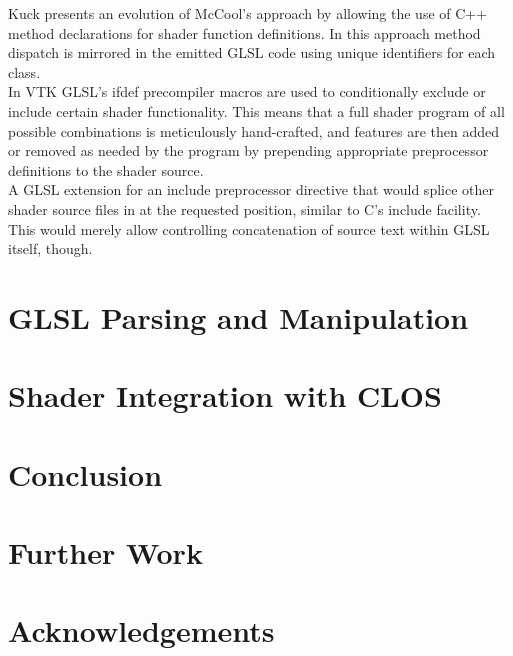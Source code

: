 \documentclass{sig-alternate}
\begin{document}
Kuck\cite{kuck2007object} presents an evolution of McCool's approach by allowing the use of C++ method declarations for shader function definitions. In this approach method dispatch is mirrored in the emitted GLSL code using unique identifiers for each class. \\

In VTK\cite{vtk} GLSL's ifdef precompiler macros are used to conditionally exclude or include certain shader functionality. This means that a full shader program of all possible combinations is meticulously hand-crafted, and features are then added or removed as needed by the program by prepending appropriate preprocessor definitions to the shader source. \\

A GLSL extension\cite{arbinclude} for an include preprocessor directive that would splice other shader source files in at the requested position, similar to C's include facility. This would merely allow controlling concatenation of source text within GLSL itself, though.

\section{GLSL Parsing and Manipulation}


\section{Shader Integration with CLOS}


\section{Conclusion}


\section{Further Work}


\section{Acknowledgements}



\end{document}

